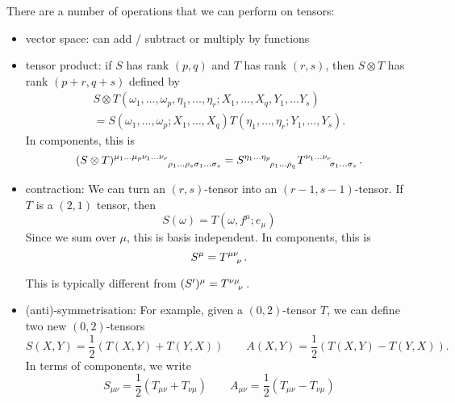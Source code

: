 There are a number of operations that we can perform on tensors:
\begin{itemize}
  \item vector space: can add / subtract or multiply by functions
  \item tensor product: if $S$ has rank $(p, q)$ and $T$ has rank $(r, s)$, then $S \otimes T$ has rank $(p + r, q + s)$ defined by
    \begin{multline}
      S \otimes T(\omega_1, \dots, \omega_p, \eta_1, \dots, \eta_r; X_1, \dots, X_q, Y_1, \dots Y_s) \\
      = S (\omega_1, \dots, \omega_p; X_1, \dots, X_q) T(\eta_1, \dots, \eta_r; Y_1, \dots, Y_s).
    \end{multline}
    In components, this is
    \begin{equation}
      (S \otimes T) \indices{^{\mu_1 \dots \mu_p \nu_1 \dots \nu_r}_{\rho_1 \dots \rho_s \sigma_1 \dots \sigma_s}} = S \indices{^{\eta_1 \dots \eta_p}_{\rho_1 \dots \rho_q}} T \indices{ ^{\nu_1 \dots \nu_r}_{\sigma_1 \dots \sigma_s}}.
    \end{equation}
  \item contraction: We can turn an $(r, s)$-tensor into an $(r-1, s-1)$-tensor. If $T$ is a $(2,1)$ tensor, then
    \begin{equation}
      S(\omega) = T(\omega, f^\mu; e_\mu)
    \end{equation}
    Since we sum over $\mu$, this is basis independent.
    In components, this is
    \begin{equation}
      S^\mu = T \indices{^\mu^\nu_\nu}.
    \end{equation}
    \begin{leftbar}
      \begin{remark}
	This is typically different from $(S')^\mu = T \indices{^\nu^\mu _\nu}$.
      \end{remark}
    \end{leftbar}
  \item (anti)-symmetrisation: For example, given a $(0,2)$-tensor $T$, we can define two new $(0, 2)$-tensors
    \begin{equation}
      S(X, Y) = \frac{1}{2} \left( T(X, Y) + T(Y, X) \right) \qquad
      A(X, Y) = \frac{1}{2} \left( T(X, Y) - T(Y, X) \right).
    \end{equation}
    In terms of components, we write
    \begin{equation}
      S_{\mu\nu} = \frac{1}{2} (T_{\mu\nu} + T_{\nu\mu}) \qquad
      A_{\mu\nu} = \frac{1}{2} (T_{\mu\nu} - T_{\nu\mu})

\end{equation}
\end{itemize}
